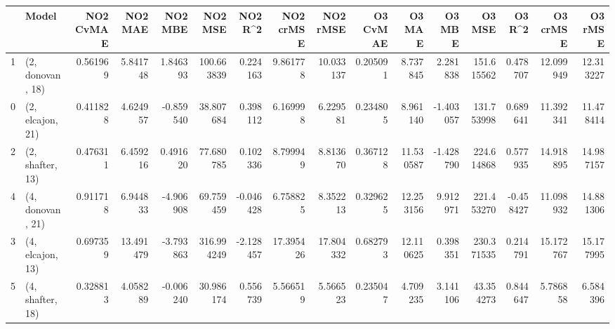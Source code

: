 \begin{tabular}{llrrrrrrrrrrrrrr}
\toprule
{} &             Model &  NO2 CvMAE &    NO2 MAE &   NO2 MBE &     NO2 MSE &   NO2 R\textasciicircum2 &  NO2 crMSE &   NO2 rMSE &  O3 CvMAE &     O3 MAE &    O3 MBE &      O3 MSE &    O3 R\textasciicircum2 &   O3 crMSE &    O3 rMSE \\
\midrule
1 &  (2, donovan, 18) &   0.561969 &   5.841748 &  1.846393 &  100.663839 &  0.224163 &   9.861778 &  10.033137 &  0.205091 &   8.737845 &  2.281838 &  151.615562 &  0.478707 &  12.099949 &  12.313227 \\
0 &  (2, elcajon, 21) &   0.411828 &   4.624957 & -0.859540 &   38.807684 &  0.398112 &   6.169998 &   6.229581 &  0.234805 &   8.961140 & -1.403057 &  131.753998 &  0.689641 &  11.392341 &  11.478414 \\
2 &  (2, shafter, 13) &   0.476311 &   6.459216 &  0.491620 &   77.680785 &  0.102336 &   8.799949 &   8.813670 &  0.367128 &  11.530587 & -1.428790 &  224.614868 &  0.577935 &  14.918895 &  14.987157 \\
4 &  (4, donovan, 21) &   0.911718 &   6.944833 & -4.906908 &   69.759459 & -0.046428 &   6.758825 &   8.352213 &  0.329625 &  12.253156 &  9.912971 &  221.453270 & -0.458427 &  11.098932 &  14.881306 \\
3 &  (4, elcajon, 13) &   0.697359 &  13.491479 & -3.793863 &  316.994249 & -2.128457 &  17.395426 &  17.804332 &  0.682793 &  12.110625 &  0.398351 &  230.371535 &  0.214791 &  15.172767 &  15.177995 \\
5 &  (4, shafter, 18) &   0.328813 &   4.058289 & -0.006240 &   30.986174 &  0.556739 &   5.566519 &   5.566523 &  0.235047 &   4.709235 &  3.141106 &   43.354273 &  0.844647 &   5.786858 &   6.584396 \\
\bottomrule
\end{tabular}
